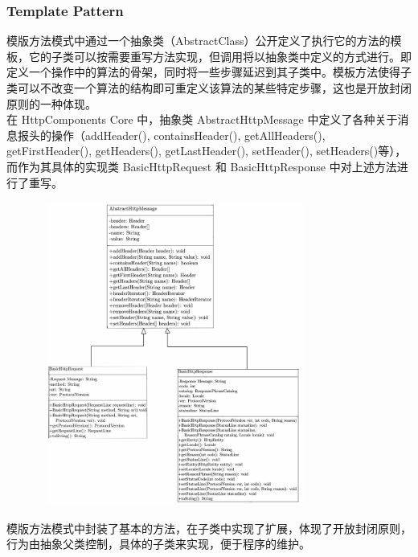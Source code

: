 \documentclass{article}
\begin{document}
	\subsubsection{Template Pattern}
	\begin{CJK}{UTF8}{gbsn}
		\indent \indent 模版方法模式中通过一个抽象类（AbstractClass）公开定义了执行它的方法的模板，它的子类可以按需要重写方法实现，但调用将以抽象类中定义的方式进行。即定义一个操作中的算法的骨架，同时将一些步骤延迟到其子类中。模板方法使得子类可以不改变一个算法的结构即可重定义该算法的某些特定步骤，这也是开放封闭原则的一种体现。\\
		\indent 在 HttpComponents Core 中，抽象类 AbstractHttpMessage 中定义了各种关于消息报头的操作（addHeader(), containsHeader(), getAllHeaders(), getFirstHeader(), getHeaders(), getLastHeader(), setHeader(), setHeaders()等），而作为其具体的实现类 BasicHttpRequest 和 BasicHttpResponse 中对上述方法进行了重写。
	\end{CJK}{}
	\begin{figure}[H]
		\centering
		\includegraphics[height = 10cm, width = 9cm]{pics/37_Template.jpg}	
	\end{figure}
	\begin{CJK}{UTF8}{gbsn}
		\indent \indent 模版方法模式中封装了基本的方法，在子类中实现了扩展，体现了开放封闭原则，行为由抽象父类控制，具体的子类来实现，便于程序的维护。
	\end{CJK}{}

	\clearpage
\end{document}
